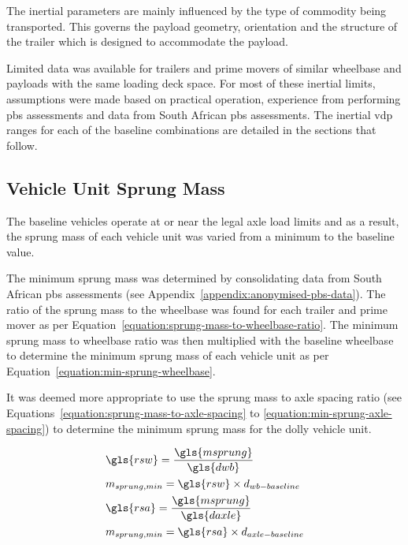 The inertial parameters are mainly influenced by the type of commodity being transported. This governs the payload geometry, orientation and the structure of the trailer which is designed to accommodate the payload.

Limited data was available for trailers and prime movers of similar wheelbase and payloads with the same loading deck space. For most of these inertial limits, assumptions were made based on practical operation, experience from performing \gls{pbs} assessments and data from South African \gls{pbs} assessments. The inertial \gls{vdp} ranges for each of the baseline combinations are detailed in the sections that follow.

\subsection{Vehicle Unit Sprung Mass}\label{section:pr-vehicle-unit-sprung-masses}
The baseline vehicles operate at or near the legal axle load limits and as a result, the sprung mass of each vehicle unit was varied from a minimum to the baseline value.

The minimum sprung mass was determined by consolidating data from South African \gls{pbs} assessments (see Appendix~\ref{appendix:anonymised-pbs-data}). The ratio of the sprung mass to the wheelbase was found for each trailer and prime mover as per Equation~\ref{equation:sprung-mass-to-wheelbase-ratio}. The minimum sprung mass to wheelbase ratio was then multiplied with the baseline wheelbase to determine the minimum sprung mass of each vehicle unit as per Equation~\ref{equation:min-sprung-wheelbase}.

It was deemed more appropriate to use the sprung mass to axle spacing ratio (see Equations~\ref{equation:sprung-mass-to-axle-spacing} to \ref{equation:min-sprung-axle-spacing}) to determine the minimum sprung mass for the dolly vehicle unit.

\begin{align}
		\label{equation:sprung-mass-to-wheelbase-ratio}
		&\gls{rsw} = \frac{\gls{msprung}}{\gls{dwb}}\\
		\label{equation:min-sprung-wheelbase}
		&m_{sprung,min} = \gls{rsw} \times d_{wb-baseline}\\
		\label{equation:sprung-mass-to-axle-spacing}
		&\gls{rsa} = \frac{\gls{msprung}}{\gls{daxle}}\\
		\label{equation:min-sprung-axle-spacing}
		&m_{sprung,min} = \gls{rsa} \times d_{axle-baseline}
\end{align}

